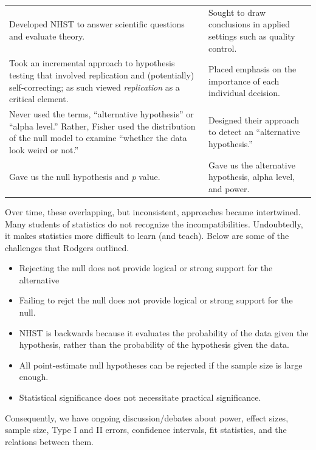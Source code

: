 \documentclass[
  11pt,
]{book}
\providecommand{\tightlist}{%
  \setlength{\itemsep}{0pt}\setlength{\parskip}{0pt}}
\begin{document}
\begin{longtable}[]{@{}
  >{\raggedright\arraybackslash}p{}
  >{\raggedright\arraybackslash}p{}@{}}
\toprule\noalign{}
\endhead
\bottomrule\noalign{}
\endlastfoot
Developed NHST to answer scientific questions and evaluate theory. & Sought to draw conclusions in applied settings such as quality control. \\
Took an incremental approach to hypothesis testing that involved replication and (potentially) self-correcting; as such viewed \emph{replication} as a critical element. & Placed emphasis on the importance of each individual decision. \\
Never used the terms, ``alternative hypothesis'' or ``alpha level.'' Rather, Fisher used the distribution of the null model to examine ``whether the data look weird or not.'' & Designed their approach to detect an ``alternative hypothesis.'' \\
Gave us the null hypothesis and \emph{p} value. & Gave us the alternative hypothesis, alpha level, and power. \\
\end{longtable}

Over time, these overlapping, but inconsistent, approaches became intertwined. Many students of statistics do not recognize the incompatibilities. Undoubtedly, it makes statistics more difficult to learn (and teach). Below are some of the challenges that Rodgers \citeyearpar{rodgers_epistemology_2010} outlined.

\begin{itemize}
\tightlist
\item
  Rejecting the null does not provide logical or strong support for the alternative
\item
  Failing to rejct the null does not provide logical or strong support for the null.
\item
  NHST is backwards because it evaluates the probability of the data given the hypothesis, rather than the probability of the hypothesis given the data.
\item
  All point-estimate null hypotheses can be rejected if the sample size is large enough.
\item
  Statistical significance does not necessitate practical significance.
\end{itemize}

Consequently, we have ongoing discussion/debates about power, effect sizes, sample size, Type I and II errors, confidence intervals, fit statistics, and the relations between them.
\end{document}
